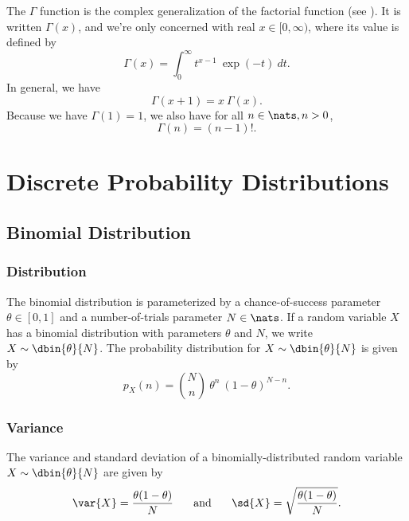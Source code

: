 The $\Gamma$ function is the complex generalization of the factorial
function (see ).  It is written $\Gamma(x)$, 
and we're only concerned with real $x \in [0,\infty)$, where its value
is defined by 
%
\begin{equation}
\Gamma(x) = \int_0^{\infty} t^{x-1} \ \exp(-t) \ dt.
\end{equation}
%
In general, we have
%
\begin{equation}
\Gamma(x+1) = x \ \Gamma(x).
\end{equation}
%
Because we have $\Gamma(1) = 1$, we also have for all $n \in \nats, n > 0$, 
%
\begin{equation}
\Gamma(n) = (n-1)!.
\end{equation}


\section{Discrete Probability Distributions}


\subsection{Binomial Distribution}

\subsubsection{Distribution}

The binomial distribution is parameterized by a chance-of-success
parameter $\theta \in [0,1]$ and a number-of-trials parameter $N \in
\nats$.  If a random variable $X$ has a binomial distribution with
parameters $\theta$ and $N$, we write $X \sim \dbin{\theta}{N}$.  The
probability distribution for $X \sim \dbin{\theta}{N}$ is given by 
%
\begin{equation}
p_X(n) = {N \choose n} \ \theta^{n} \ (1-\theta)^{N-n}.
\end{equation}
%
%

\subsubsection{Variance}\label{section:stats-binomial-variance}

The variance and standard deviation of a binomially-distributed random
variable $X \sim \dbin{\theta}{N}$ are given by
%
\begin{equation}
\hfill
\var{X} = \frac{\theta (1 - \theta)}{N} 
\hspace*{0.25in}
\mbox{and}
\hspace*{0.25in}
\sd{X} = \sqrt{\frac{\theta (1 - \theta)}{N}}.
\hfill
\end{equation}
%

